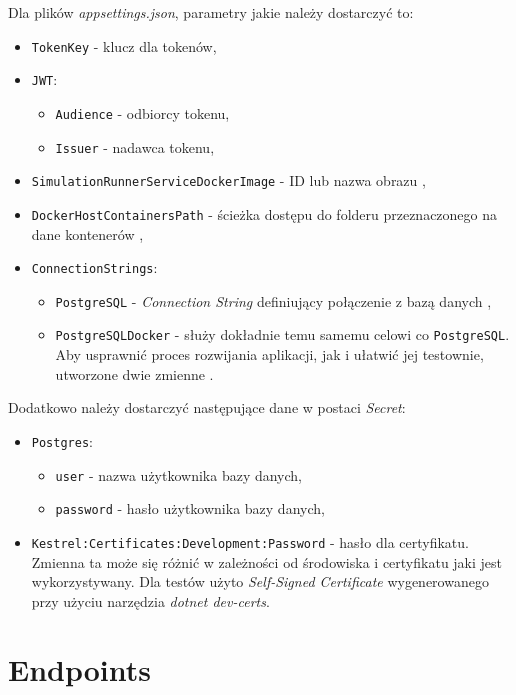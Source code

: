 \par Dla plików \emph{appsettings.json}, parametry jakie należy dostarczyć to:
\begin{itemize}
	\item \texttt{TokenKey} - klucz dla tokenów,
	\item \texttt{JWT}:
	\begin{itemize}
		\item \texttt{Audience} - odbiorcy tokenu,
		\item \texttt{Issuer} - nadawca tokenu,
	\end{itemize}
	\item \texttt{SimulationRunnerServiceDockerImage} - ID lub nazwa obrazu \emph{\docker{}},
	\item \texttt{DockerHostContainersPath} - ścieżka dostępu do folderu przeznaczonego na dane kontenerów ,
	\item \texttt{ConnectionStrings}:
	\begin{itemize}
		\item \texttt{PostgreSQL} - \emph{Connection String} definiujący połączenie z bazą danych ,
		\item \texttt{PostgreSQLDocker} - służy dokładnie temu samemu celowi co \texttt{PostgreSQL}. Aby usprawnić proces rozwijania aplikacji, jak i ułatwić jej testownie, utworzone dwie zmienne .
	\end{itemize}
\end{itemize}

\par Dodatkowo należy dostarczyć następujące dane w postaci \emph{\dotnet{} Secret}:
\begin{itemize}
	\item \texttt{Postgres}:
	\begin{itemize}
		\item \texttt{user} - nazwa użytkownika bazy danych,
		\item \texttt{password} - hasło użytkownika bazy danych,
	\end{itemize}
	\item \texttt{Kestrel:Certificates:Development:Password} - hasło dla certyfikatu. Zmienna ta może się różnić w zależności od środowiska i certyfikatu jaki jest wykorzystywany. Dla testów użyto \emph{Self-Signed Certificate} wygenerowanego przy użyciu narzędzia \emph{dotnet dev-certs}.
\end{itemize}

\section{Endpoints}

